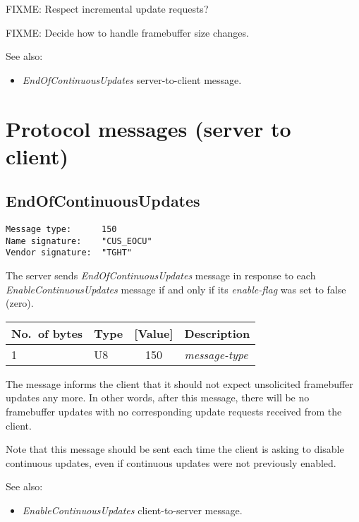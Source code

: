 \documentclass[a4paper]{article}
\newcommand{\typestr}[1]{\textit{#1}}
\begin{document}
FIXME: Respect incremental update requests?

FIXME: Decide how to handle framebuffer size changes.

See also:
\begin{itemize}
\item \typestr{EndOfContinuousUpdates} server-to-client message.
\end{itemize}

\newpage
\section{Protocol messages (server to client)}

\subsection{EndOfContinuousUpdates}
\begin{verbatim}
Message type:      150
Name signature:    "CUS_EOCU"
Vendor signature:  "TGHT"
\end{verbatim}

The server sends \typestr{EndOfContinuousUpdates} message in response
to each \typestr{EnableContinuousUpdates} message if and only if its
\typestr{enable-flag} was set to false (zero).

\begin{tabular}{l|lc|l} \hline
No.\ of bytes & Type & [Value] & Description \\ \hline
1 & U8  & 150 & \typestr{message-type} \\
\hline\end{tabular}

The message informs the client that it should not expect unsolicited
framebuffer updates any more. In other words, after this message,
there will be no framebuffer updates with no corresponding update
requests received from the client.

Note that this message should be sent each time the client is asking
to disable continuous updates, even if continuous updates were not
previously enabled.

See also:
\begin{itemize}
\item \typestr{EnableContinuousUpdates} client-to-server message.
\end{itemize}
\end{document}
